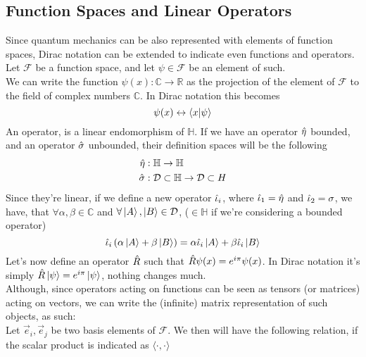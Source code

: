 \documentclass[../qm.tex]{subfiles}
\begin{document}
	\subsection{Function Spaces and Linear Operators}
	Since quantum mechanics can be also represented with elements of function spaces, Dirac notation can be extended to indicate even functions and operators.\\
	Let $\mathcal{F}$ be a function space, and let $\psi\in\mathcal{F}$ be an element of such.\\
	We can write the function $\psi(x):\mathbb{C}\to\mathbb{R}$ as the projection of the element of $\mathcal{F}$ to the field of complex numbers $\mathbb{C}$. In Dirac notation this becomes
	\begin{equation}
		\psi(x)\leftrightarrow\bra{x}\ket{\psi}
		\label{eq:functionstokets}
	\end{equation}
	An operator, is a linear endomorphism of $\mathbb{H}$. If we have an operator $\hat{\eta}$ bounded, and an operator $\hat{\sigma}$ unbounded, their definition spaces will be the following
	\begin{equation}
		\begin{aligned}
			\hat{\eta}&:\mathbb{H}\to\mathbb{H}\\
			\hat{\sigma}&:\mathcal{D}\subset\mathbb{H}\to\mathcal{D}\subset{H}
		\end{aligned}
		\label{eq:linopdefi}
	\end{equation}
	Since they're linear, if we define a new operator $\hat{\iota}_i$, where $\hat{\iota}_1=\hat{\eta}$ and $\hat{\iota}_2=\sigma$, we have, that $\forall\alpha,\beta\in\mathbb{C}$ and $\forall\ket{A},\ket{B}\in\mathcal{D}$, ($\in\mathbb{H}$ if we're considering a bounded operator)
	\begin{equation}
		\hat{\iota}_i\left( \alpha\ket{A}+\beta\ket{B} \right)=\alpha\hat{\iota}_i\ket{A}+\beta\hat{\iota}_i\ket{B}
		\label{eq:lineardef}
	\end{equation}
	Let's now define an operator $\hat{R}$ such that $\hat{R}\psi(x)=e^{i\pi}\psi(x)$. In Dirac notation it's simply $\hat{R}\ket{\psi}=e^{i\pi}\ket{\psi}$, nothing changes much.\\
	Although, since operators acting on functions can be seen as tensors (or matrices) acting on vectors, we can write the (infinite) matrix representation of such objects, as such:\\
	Let $\vec{e}_i,\vec{e}_j$ be two basis elements of $\mathcal{F}$. We then will have the following relation, if the scalar product is indicated as $\langle\cdot,\cdot\rangle$
\end{document}
